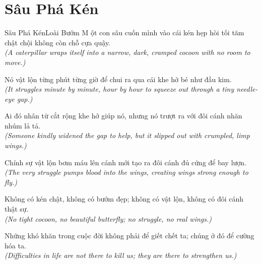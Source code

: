 \section{Sâu Phá Kén}
\begin{truyen}{Sâu Phá Kén}{Loài Bướm}
M ột con sâu cuốn mình vào cái kén hẹp hòi tối tăm chật chội không còn chỗ cựa quậy.\\
\textit{(A caterpillar wraps itself into a narrow, dark, cramped cocoon with no room to move.)}

Nó vật lộn từng phút từng giờ để chui ra qua cái khe hở bé như đầu kim.\\
\textit{(It struggles minute by minute, hour by hour to squeeze out through a tiny needle-eye gap.)}

Ai đó nhân từ cắt rộng khe hở giúp nó, nhưng nó trượt ra với đôi cánh nhăn nhúm lả tả.\\
\textit{(Someone kindly widened the gap to help, but it slipped out with crumpled, limp wings.)}

Chính sự vật lộn bơm máu lên cánh mới tạo ra đôi cánh đủ cứng để bay lượn.\\
\textit{(The very struggle pumps blood into the wings, creating wings strong enough to fly.)}

Không có kén chật, không có bướm đẹp; không có vật lộn, không có đôi cánh thật sự.\\
\textit{(No tight cocoon, no beautiful butterfly; no struggle, no real wings.)}

\end{truyen}
\begin{baihoc}
  Những khó khăn trong cuộc đời không phải để giết chết ta; chúng ở đó để cường hóa ta.\\
  \textit{(Difficulties in life are not there to kill us; they are there to strengthen us.)}
\end{baihoc}

